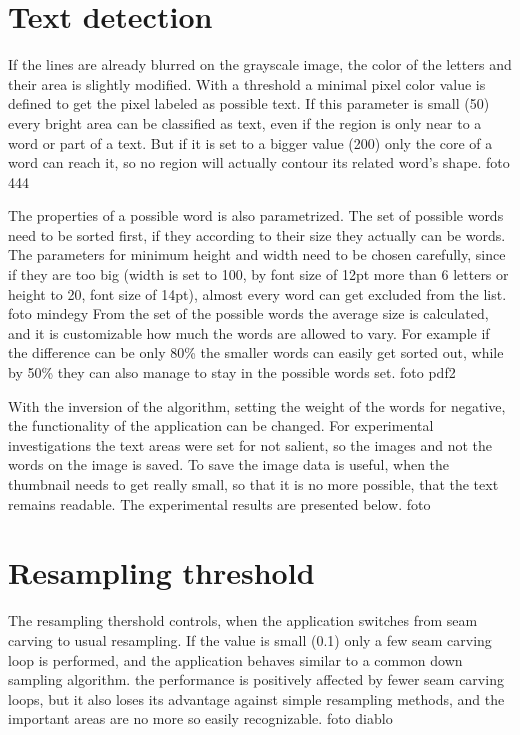 \documentclass[draft,final]{vutinfth} %
\begin{document}
\section{Text detection}
If the lines are already blurred on the grayscale image, the color of the letters and their area is slightly modified. 
With a threshold a minimal pixel color value is defined to get the pixel labeled as possible text.
If this parameter is small (50) every bright area can be classified as text, even if the region is only near to a word or part of a text.
But if it is set to a bigger value (200) only the core of a word can reach it, so no region will actually contour its related word's shape.
foto 444\par
The properties of a possible word is also parametrized.
The set of possible words need to be sorted first, if they according to their size they actually can be words.
The parameters for minimum height and width need to be chosen carefully, since if they are too big (width is set to 100, by font size of 12pt more than 6 letters or height to 20, font size of 14pt), almost every word can get excluded from the list.
foto mindegy 
From the set of the possible words the average size is calculated, and it is customizable how much the words are allowed to vary.
For example if the difference can be only 80\% the smaller words can easily get sorted out, while by 50\% they can also manage to stay in the possible words set.
foto pdf2\par 
With the inversion of the algorithm, setting the weight of the words for negative, the functionality of the application can be changed.
For experimental investigations the text areas were set for not salient, so the images and not the words on the image is saved. 
To save the image data is useful, when the thumbnail needs to get really small, so that it is no more possible, that the text remains readable. 
The experimental results are presented below.
foto 
\section{Resampling threshold}
The resampling thershold controls, when the application switches from seam carving to usual resampling. 
If the value is small (0.1) only a few seam carving loop is performed, and the application behaves similar to a common down sampling algorithm.
the performance is positively affected by fewer seam carving loops, but it also loses its advantage against simple resampling methods, and the important areas are no more so easily recognizable.
foto diablo 
\end{document}
